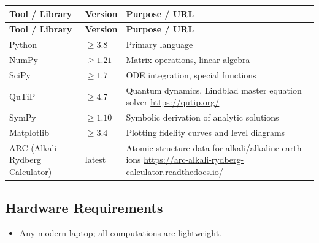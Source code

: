 \documentclass[11pt,a4paper]{article}
\begin{document}
\begin{longtable}{p{4.5cm} p{2.5cm} p{6.5cm}}
\toprule
\textbf{Tool / Library} & \textbf{Version} & \textbf{Purpose / URL} \\
\midrule
\endfirsthead
\toprule
\textbf{Tool / Library} & \textbf{Version} & \textbf{Purpose / URL} \\
\midrule
\endhead
Python & $\geq 3.8$ & Primary language \\
\midrule
NumPy & $\geq 1.21$ & Matrix operations, linear algebra \\
\midrule
SciPy & $\geq 1.7$ & ODE integration, special functions \\
\midrule
QuTiP & $\geq 4.7$ & Quantum dynamics, Lindblad master equation solver \newline \url{https://qutip.org/} \\
\midrule
SymPy & $\geq 1.10$ & Symbolic derivation of analytic solutions \\
\midrule
Matplotlib & $\geq 3.4$ & Plotting fidelity curves and level diagrams \\
\midrule
ARC (Alkali Rydberg Calculator) & latest & Atomic structure data for alkali/alkaline-earth ions \newline \url{https://arc-alkali-rydberg-calculator.readthedocs.io/} \\
\bottomrule
\end{longtable}

\subsection{Hardware Requirements}
\begin{itemize}
  \item Any modern laptop; all computations are lightweight.
\end{itemize}
\end{document}

